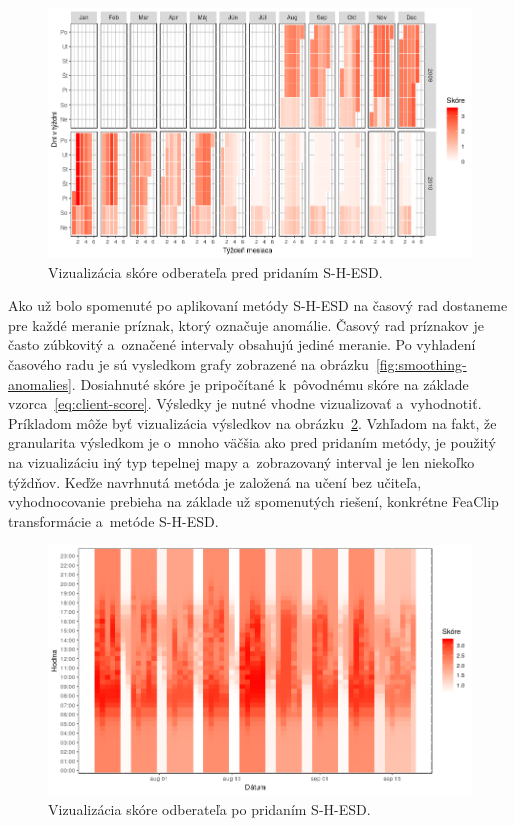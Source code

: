 \documentclass[a4paper,twoside,slovak,12pt,appendix]{article}
\begin{document}
\begin{figure}[htbp]
  \centering
  \includegraphics[width=\textwidth]{heatmap_days.png}
  \caption{Vizualizácia skóre odberateľa pred pridaním S-H-ESD.}
  \label{fig:heatmap-days}
\end{figure}

\noindent
Ako už bolo spomenuté po aplikovaní metódy S-H-ESD na časový rad dostaneme pre
každé meranie príznak, ktorý označuje anomálie. Časový rad príznakov je často
zúbkovitý a~označené intervaly obsahujú jediné meranie. Po vyhladení časového
radu je sú vysledkom grafy zobrazené na obrázku~\ref{fig:smoothing-anomalies}.
Dosiahnuté skóre je pripočítané k~pôvodnému skóre na základe
vzorca~\ref{eq:client-score}. Výsledky je nutné vhodne vizualizovať
a~vyhodnotiť. Príkladom môže byť vizualizácia výsledkov na
obrázku~\ref{fig:heatmap-hours}. Vzhľadom na fakt, že granularita výsledkom je
o~mnoho väčšia ako pred pridaním metódy, je použitý na vizualizáciu iný typ
tepelnej mapy a~zobrazovaný interval je len niekoľko týždňov. Keďže navrhnutá
metóda je založená na učení bez učiteľa, vyhodnocovanie prebieha na základe už
spomenutých riešení, konkrétne FeaClip transformácie a~metóde S-H-ESD.

\begin{figure}[htbp]
  \centering
  \includegraphics[width=\textwidth]{heatmap_hours.png}
  \caption{Vizualizácia skóre odberateľa po pridaním S-H-ESD.}
  \label{fig:heatmap-hours}
\end{figure}
\end{document}
